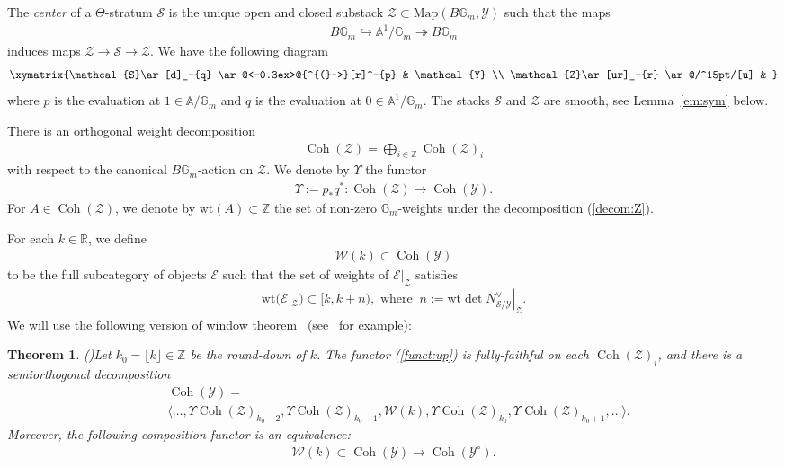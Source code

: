 \documentclass [11pt,oneside,a4paper,mathscr]{amsart}
\makeatletter
\newtheorem{thm}{Theorem}[section]
\theoremstyle{definition}
\newcommand{\Y}{\mathcal{Y}}
\newcommand{\bgm}{B\mathbb{G}_m}
\newcommand{\Coh}{\operatorname{Coh}}
\newcommand{\inclusion}{\ar@<-0.3ex>@{^{(}->}[r]}
\newcommand{\wt}{\mathrm{wt}}
\makeatother
\begin{document}
The \textit{center} of a $\Theta$-stratum $\mathcal{S}$ is 
the unique open and closed substack $\mathcal{Z}\subset \mathrm{Map}(\bgm, \mathcal{Y})$
such that the maps 
\begin{align*}\bgm \hookrightarrow \mathbb{A}^1/\mathbb{G}_m \twoheadrightarrow \bgm
\end{align*}
induces maps $\mathcal{Z}\to\mathcal{S}\to\mathcal{Z}$. 
We have the following diagram 
\begin{align}\label{dia:SYZ}
	\xymatrix{\mathcal{S}\ar[d]_-{q} \inclusion^-{p} & \mathcal{Y} \\
	\mathcal{Z}\ar[ur]_-{r} \ar@/^15pt/[u] &	
}
	\end{align}
where $p$ is the evaluation at $1\in \mathbb{A}/\mathbb{G}_m$ and $q$ is the evaluation at $0\in \mathbb{A}^1/\mathbb{G}_m$. 
The stacks $\mathcal{S}$ and $\mathcal{Z}$ are smooth, see Lemma~\ref{em:sym} below. 

There is an orthogonal weight decomposition
	\begin{align}\label{decom:Z}
		\Coh(\mathcal{Z})=\bigoplus_{i\in \mathbb{Z}}\Coh(\mathcal{Z})_i
		\end{align}
	with respect to the canonical $\bgm$-action on $\mathcal{Z}$. 
We denote by $\Upsilon$ the functor 
	\begin{align}\label{funct:up}
		\Upsilon :=p_{\ast}q^{\ast} \colon \Coh(\mathcal{Z}) \to \Coh(\mathcal{Y}). 
		\end{align}
For $A \in \Coh(\mathcal{Z})$, we denote by $\wt(A)\subset \mathbb{Z}$ the set of non-zero $\mathbb{G}_m$-weights under the decomposition (\ref{decom:Z}).

For each $k\in \mathbb{R}$, we define 
\begin{align*}
\mathcal{W}(k) \subset \Coh(\Y)
\end{align*}
to be the full subcategory of objects $\mathcal{E}$ such that the set of weights 
of $\mathcal{E}|_{\mathcal{Z}}$ satisfies 
\begin{align*}
    \wt(\mathcal{E}|_{\mathcal{Z}}) \subset 
    [k, k+n), \mbox{ where } \ n:=\wt \det N_{\mathcal{S}/\mathcal{Y}}^{\vee}|_{\mathcal{Z}}.
\end{align*}
We will use the following version of window theorem~\cite{MR3895631, halp, HalpK32}
(see~\cite[Theorem~3.3.1]{HalpK32} for example):
\begin{thm}\emph{(\cite{MR3895631, halp, HalpK32})}\label{thm:window}
Let $k_0=\lfloor k \rfloor \in \mathbb{Z}$ be the round-down of $k$. 
The functor (\ref{funct:up}) is fully-faithful on each $\Coh(\mathcal{Z})_i$, 
and there is a semiorthogonal decomposition 
    \begin{align*}
    &\Coh(\Y)=\\
    &\langle\ldots, \Upsilon \Coh(\mathcal{Z})_{k_0-2}, \Upsilon \Coh(\mathcal{Z})_{k_0-1}, 
    \mathcal{W}(k), \Upsilon \Coh(\mathcal{Z})_{k_0}, \Upsilon \Coh(\mathcal{Z})_{k_0+1}, \ldots\rangle.
    \end{align*}
    Moreover, the following composition functor is an equivalence:
    \begin{align*}
        \mathcal{W}(k) \subset \Coh(\Y) \to \Coh(\Y^{\circ}).
    \end{align*}
\end{thm}
\end{document}
